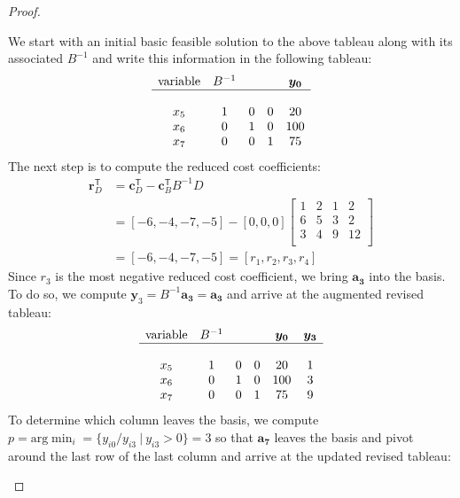 \documentclass[12pt]{article}
\theoremstyle{definition}
\newcommand{\vect}[1]{\boldsymbol{#1}}
\newcommand{\tran}{\mathsf{T}}
\begin{document}
\begin{proof}
\begin{enumerate}
      We start with an initial basic feasible solution to the above tableau
      along with its associated $B^{-1}$ and write this information in the following tableau:
      \begin{align*}
        \begin{matrix}
          \text{variable} & B^{-1} & & & \vect{y_0} \\
          \hline \\
          x_5 & 1 & 0 & 0 & 20 \\
          x_6 & 0 & 1 & 0 & 100  \\
          x_7 & 0 & 0 & 1 & 75 \\
        \end{matrix}
      \end{align*}
      The next step is to compute the reduced cost coefficients:
      \begin{align*}
        \vect{r}_D^\tran &= \vect{c}_D^\tran - \vect{c}_B^\tran B^{-1} D \\
        &= [-6, -4, -7, -5] - [0, 0, 0]
        \begin{bmatrix}
          1 & 2 & 1 & 2 \\
          6 & 5 & 3 & 2 \\
          3 & 4 & 9 & 12 \\
        \end{bmatrix} \\
        &= [-6, -4, -7, -5] = [r_1, r_2, r_3, r_4]
      \end{align*}
      Since $r_3$ is the most negative reduced cost coefficient, we bring $\vect{a_3}$ into the basis.
      To do so, we compute $\vect{y}_3 = B^{-1}\vect{a_3} = \vect{a_3}$ and arrive
      at the augmented revised tableau:
      \begin{align*}
        \begin{matrix}
          \text{variable} & B^{-1} & & & \vect{y_0} & \vect{y_3} \\
          \hline \\
          x_5 & 1 & 0 & 0 & 20 & 1 \\
          x_6 & 0 & 1 & 0 & 100& 3 \\
          x_7 & 0 & 0 & 1 & 75 & 9 \\
        \end{matrix}
      \end{align*}
      To determine which column leaves the basis, we compute
      $p = \text{arg}\min_i = \{y_{i0} / y_{i3} \ | \ y_{i3} > 0\} = 3$ so that $\vect{a_7}$
      leaves the basis and pivot around the last row of the last column and arrive at the updated revised tableau:

\end{enumerate}
\end{proof}
\end{document}
